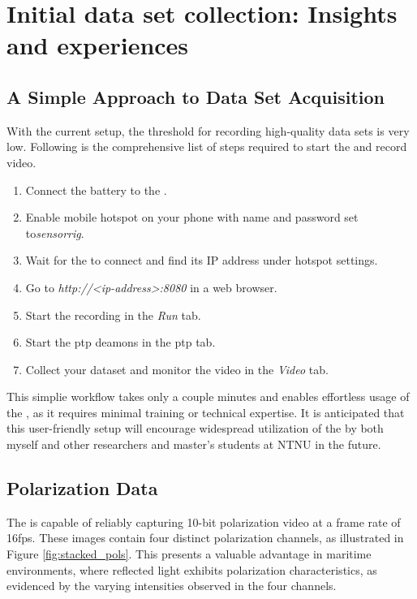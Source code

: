 \chapter{Initial data set collection: Insights and experiences}
\label{chap:results}

\section{A Simple Approach to Data Set Acquisition}
With the current setup, the threshold for recording high-quality data sets is very low.
Following is the comprehensive list of steps required to start the \sr and record video.
\begin{enumerate}
    \item Connect the battery to the \jx.
    \item Enable mobile hotspot on your phone with name and password set to\textit{sensorrig}.
    \item Wait for the \sr to connect and find its IP address under hotspot settings.
    \item Go to \textit{http://<ip-address>:8080} in a web browser.
    \item Start the recording in the \textit{Run} tab.
    \item Start the \gls{ptp} deamons in the \gls{ptp} tab.
    \item Collect your dataset and monitor the video in the \textit{Video} tab.
\end{enumerate}
This simplie workflow takes only a couple minutes and enables effortless usage of the \sr, as it requires minimal training or technical expertise.
It is anticipated that this user-friendly setup will encourage widespread utilization of the \sr by both myself and other researchers and master's students at NTNU in the future.


\section{Polarization Data}
The \sr is capable of reliably capturing 10-bit polarization video at a frame rate of 16fps.
These images contain four distinct polarization channels, as illustrated in Figure \ref{fig:stacked_pols}.
This presents a valuable advantage in maritime environments, where reflected light exhibits polarization characteristics, as evidenced by the varying intensities observed in the four channels.

